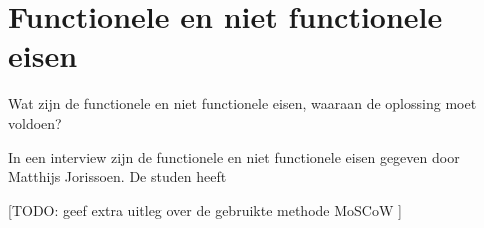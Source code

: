 \section{Functionele en niet functionele eisen}
\label{sec:deelvraag1}

Wat zijn de functionele en niet functionele eisen, waaraan de oplossing moet voldoen?

In een interview zijn de functionele en niet functionele eisen gegeven door Matthijs Jorissoen. De studen heeft 

[TODO: geef extra uitleg over de gebruikte methode MoSCoW \cite{ma2009effectiveness}]

\begin{comment}
Een functionele eis kan gezien worden als iets dat de gebruiker nodig heeft om het doel te bereiken of een bepaalde voorwaarde waaraan de oplossing moet voldoen.

Een non functionele eis is een beperking doe wordt opgelegd op een mogelijke oplossing, met het doel om functionele eisen te behalen of het doel van het project.
\end{comment}

